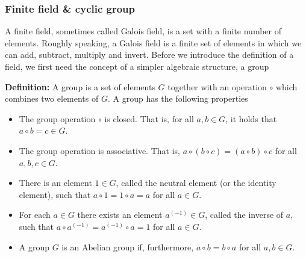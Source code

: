 \subsubsection{Finite field \& cyclic group}

A finite field, sometimes called Galois field, is a set with a finite number of elements. Roughly speaking, a Galois field is a finite set of elements in which we can add, subtract, multiply and invert. Before we introduce the definition of a field, we first need the concept of a simpler algebraic structure, a group

\vspace{0.5cm}\textbf{Definition:} A group is a set of elements $G$ together with an operation $\circ$ which combines two elements of $G$. A group has the following properties
\begin{itemize}
  \item The group operation $\circ$ is closed. That is, for all $a,b \in G$, it holds that $a \circ b = c \in G$.\\
  \item The group operation is associative. That is, $a \circ (b \circ c) = (a \circ b) \circ c$ for all $a, b, c \in G$.\\
  \item There is an element $1 \in G$, called the neutral element (or the identity element), such that $a \circ 1 = 1 \circ a = a$ for all $a \in G$.\\
  \item For each $a \in G$ there exists an element $a^(-1) \in G$, called the inverse of $a$, such that $a \circ a^(-1) = a^(-1) \circ a = 1$ for all $a \in G$.\\
  \item A group $G$ is an Abelian group if, furthermore, $a \circ b = b \circ a$ for all $a, b \in G$.\\

\end{itemize}

